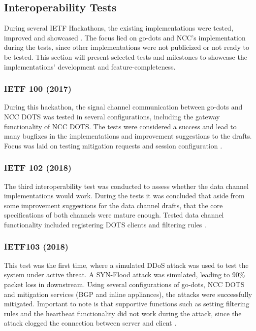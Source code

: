 \subsection{Interoperability Tests}
During several IETF Hackathons, the existing implementations were tested, improved and showcased \cite{interop-100, interop-101, interop-102, interop-103, interop-104}. The focus lied on go-dots and NCC's implementation during the tests, since other implementations were not publicized or not ready to be tested. This section will present selected tests and milestones to showcase the implementations' development and feature-completeness. 

\subsubsection{IETF 100 (2017)}
During this hackathon, the signal channel communication between go-dots and NCC DOTS was tested in several configurations, including the gateway functionality of NCC DOTS. The tests were considered a success and lead to many bugfixes in the implementations and improvement suggestions to the drafts. Focus was laid on testing mitigation requests and session configuration \cite{interop-100}.

\subsubsection{IETF 102 (2018)}
The third interoperability test was conducted to assess whether the data channel implementations would work. During the tests it was concluded that aside from some improvement suggestions for the data channel drafts, that the core specifications of both channels were mature enough. Tested data channel functionality included registering DOTS clients and filtering rules \cite{interop-102}.

\subsubsection{IETF103 (2018)}
This test was the first time, where a simulated DDoS attack was used to test the system under active threat. A SYN-Flood attack was simulated, leading to 90\% packet loss in downstream. Using several configurations of go-dots, NCC DOTS and mitigation services (BGP and inline appliances), the attacks were successfully mitigated. Important to note is that supportive functions such as setting filtering rules and the heartbeat functionality did not work during the attack, since the attack clogged the connection between server and client \cite{interop-103}.

